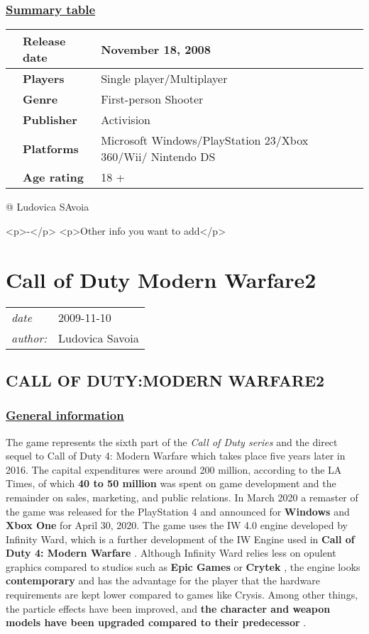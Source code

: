 \documentclass[a4paper,10pt]{book}
\newcommand{\pageHeader}[4]{
    \section{#1}
    \vspace{-0.3cm}
    \begin{table}[h!]
     \begin{tabular}{ll}
        \hline
        \textit{date} & #2 \\
        \textit{author: } & #3\\
        \hline
     \end{tabular}
    \end{table}
    \vspace{-0.3cm}
}
\begin{document}
 \subsubsection{\underline{Summary table }}
 \begin{longtable}{p{1mm}|l|l|}\hline
 
 & \textbf{Release date } 
 & November 18, 2008 
 \\\hline
 
 & \textbf{Players } 
 & Single player/Multiplayer 
 \\\hline
 
 & \textbf{Genre } 
 & First-person Shooter 
 \\\hline
 
 & \textbf{Publisher } 
 & Activision 
 \\\hline
 
 & \textbf{Platforms } 
 & Microsoft Windows/PlayStation 23/Xbox 360/Wii/ Nintendo DS 
 \\\hline
 
 & \textbf{Age rating } 
 & 18 + 
 \\\hline
 \end{longtable}
 
 @ Ludovica SAvoia 
 
            <p>-</p>
            <p>Other info you want to add</p>
           
 
 \newpage\pageHeader{Call of Duty Modern Warfare2}{2009-11-10}{Ludovica Savoia}{Sixth of the Call of Duty series but first as videogame}
 \subsection{CALL OF DUTY:MODERN WARFARE2 }
 \subsubsection{\underline{General information }}
 
          The game represents the sixth part of the  \textit{Call of Duty series } and the direct sequel to Call of Duty 4: Modern Warfare
          which takes place five years later in 2016. The capital expenditures were around  200 million, according to the LA
          Times, of which  \textbf{40 to 50 million }  was spent on game development and the remainder on sales, marketing, and public
          relations.
          In March 2020 a remaster of the game was released for the PlayStation 4 and announced for  \textbf{Windows }  and  \textbf{Xbox One } 
          for April 30, 2020.
          The game uses the IW 4.0 engine developed by Infinity Ward, which is a further development of the IW Engine
          used in  \textbf{Call of Duty 4: Modern Warfare } .  
          Although Infinity Ward relies less on opulent graphics compared to studios such as  \textbf{Epic Games }  or  \textbf{Crytek } , the engine looks  \textbf{contemporary }  and has the advantage for the player that the hardware
          requirements are kept lower compared to games like Crysis. Among other things, the particle effects have been
          improved, and  \textbf{the character and weapon models have been upgraded compared to their predecessor } .
         
\end{document}
